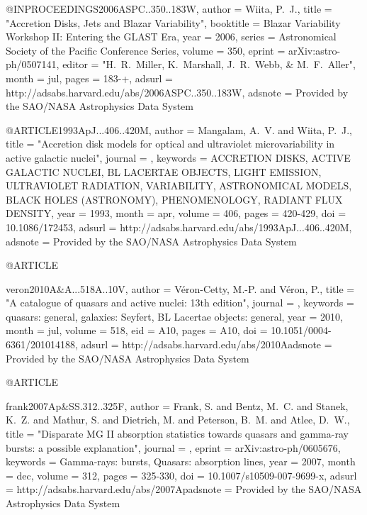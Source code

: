 \documentclass[twocolumn]{aastex62}
\begin{document}
{{{{{{{@INPROCEEDINGS{2006ASPC..350..183W,
   author = {{Wiita}, P.~J.},
    title = "{Accretion Disks, Jets and Blazar Variability}",
booktitle = {Blazar Variability Workshop II: Entering the GLAST Era},
     year = 2006,
   series = {Astronomical Society of the Pacific Conference Series},
   volume = 350,
   eprint = {arXiv:astro-ph/0507141},
   editor = "{H.~R.~Miller, K.~Marshall, J.~R.~Webb, \& M.~F.~Aller}",
    month = jul,
    pages = {183-+},
   adsurl = {http://adsabs.harvard.edu/abs/2006ASPC..350..183W},
  adsnote = {Provided by the SAO/NASA Astrophysics Data System}
}


@ARTICLE{1993ApJ...406..420M,
   author = {{Mangalam}, A.~V. and {Wiita}, P.~J.},
    title = "{Accretion disk models for optical and ultraviolet microvariability in active galactic nuclei}",
  journal = {\apj},
 keywords = {ACCRETION DISKS, ACTIVE GALACTIC NUCLEI, BL LACERTAE OBJECTS, LIGHT EMISSION, ULTRAVIOLET RADIATION, VARIABILITY, ASTRONOMICAL MODELS, BLACK HOLES (ASTRONOMY), PHENOMENOLOGY, RADIANT FLUX DENSITY},
     year = 1993,
    month = apr,
   volume = 406,
    pages = {420-429},
      doi = {10.1086/172453},
   adsurl = {http://adsabs.harvard.edu/abs/1993ApJ...406..420M},
  adsnote = {Provided by the SAO/NASA Astrophysics Data System}
}


@ARTICLE{veron2010A&A...518A..10V,
   author = {{V{\'e}ron-Cetty}, M.-P. and {V{\'e}ron}, P.},
    title = "{A catalogue of quasars and active nuclei: 13th edition}",
  journal = {\aap},
 keywords = {quasars: general, galaxies: Seyfert, BL Lacertae objects: general},
     year = 2010,
    month = jul,
   volume = 518,
      eid = {A10},
    pages = {A10},
      doi = {10.1051/0004-6361/201014188},
   adsurl = {http://adsabs.harvard.edu/abs/2010Aadsnote = {Provided by the SAO/NASA Astrophysics Data System}
}
 







@ARTICLE{frank2007Ap&SS.312..325F,
   author = {{Frank}, S. and {Bentz}, M.~C. and {Stanek}, K.~Z. and {Mathur}, S. and 
	{Dietrich}, M. and {Peterson}, B.~M. and {Atlee}, D.~W.},
    title = "{Disparate MG II absorption statistics towards quasars and gamma-ray bursts: a possible explanation}",
  journal = {\apss},
   eprint = {arXiv:astro-ph/0605676},
 keywords = {Gamma-rays: bursts, Quasars: absorption lines},
     year = 2007,
    month = dec,
   volume = 312,
    pages = {325-330},
      doi = {10.1007/s10509-007-9699-x},
   adsurl = {http://adsabs.harvard.edu/abs/2007Apadsnote = {Provided by the SAO/NASA Astrophysics Data System}
}



}}}}}}}}}
\end{document}
